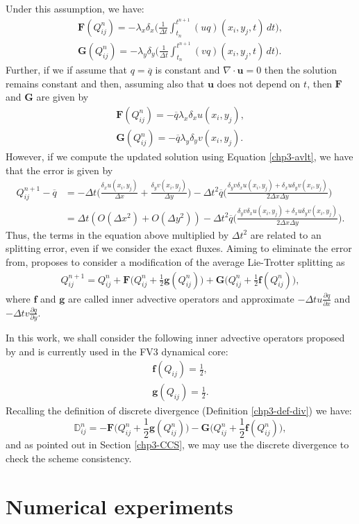Under this assumption, we have:
\begin{align*}
	\mathbf{F}(Q_{ij}^n) = -\lambda_x{\delta_x}\bigg(\frac{1}{\Delta t} \int_{t_n}^{t^{n+1}} (uq)(x_i,y_j,t) \,dt \bigg) ,\\
	\mathbf{G}(Q_{ij}^n) = -\lambda_y{\delta_y}\bigg(\frac{1}{\Delta t} \int_{t_n}^{t^{n+1}} (vq)(x_i,y_j,t) \,dt \bigg).
\end{align*}
Further, if we if assume that $q = \overline{q}$ is constant and $\nabla \cdot \boldsymbol{u} = 0$ then the solution
remains constant and then, assuming also that $\boldsymbol{u}$ does not depend on $t$, then $\mathbf{F}$ and $\mathbf{G}$ are given by
\begin{align*}
	\mathbf{F}(Q_{ij}^n) = -\overline{q} \lambda_x{\delta_x} u(x_i,y_j),\\
	\mathbf{G}(Q_{ij}^n) = -\overline{q} \lambda_y{\delta_y} v(x_i,y_j).
\end{align*}
However, if we compute the updated solution using Equation \eqref{chp3-avlt}, we have that the error is given by
\begin{align*}
	Q^{n+1}_{ij} - \overline{q} &= 
	-\Delta t \bigg(\frac{\delta_x u(x_i,y_j)}{\Delta x} + 	\frac{\delta_y v(x_i,y_j)}{\Delta y} \bigg)
	-\Delta t^2 \overline{q}\bigg( \frac{\delta_y v \delta_x u(x_i,y_j) + \delta_x u\delta_y v(x_i,y_j)}{2\Delta x \Delta y} \bigg) \\
	&= \Delta t (O(\Delta x^2) + O(\Delta y^2))
	   -\Delta t^2 \overline{q}\bigg( \frac{\delta_y v \delta_x u(x_i,y_j) + \delta_x u\delta_y v(x_i,y_j)}{2\Delta x \Delta y} \bigg).
\end{align*}
Thus, the terms in the equation above multiplied by $\Delta t^2$ are related to an splitting error, even if we consider the exact fluxes.
Aiming to eliminate the error from, \citet{lin:1996} proposes to consider a modification of the average Lie-Trotter splitting as
\begin{align}
	\label{chp3-avlt2}
	Q^{n+1}_{ij} = Q_{ij}^n +  
	\mathbf{F}\bigg(Q_{ij}^n + \frac{1}{2}\mathbf{g}(Q_{ij}^n)\bigg) +  
	\mathbf{G}\bigg(Q_{ij}^n + \frac{1}{2}\mathbf{f}(Q_{ij}^n)\bigg),
\end{align}
where $\mathbf{f}$ and $\mathbf{g}$ are called inner advective operators and approximate
$-\Delta t u \frac{\partial q}{\partial x}$ and $-\Delta t v \frac{\partial q}{\partial y}$.

In this work, we shall consider the following  inner advective operators proposed by \citet{putman:2007}
and is currently used in the FV3 dynamical core:
\begin{align}
	\mathbf{f}(Q_{ij}) = \frac{1}{2},\\
	\mathbf{g}(Q_{ij}) = \frac{1}{2}.
\end{align}
Recalling the definition of discrete divergence (Definition \ref{chp3-def-div}) we have:
\begin{equation}
	\mathbb{D}_{ij}^n = 
	-\mathbf{F}\bigg(Q_{ij}^n + \frac{1}{2}\mathbf{g}(Q_{ij}^n)\bigg) 
	-\mathbf{G}\bigg(Q_{ij}^n + \frac{1}{2}\mathbf{f}(Q_{ij}^n)\bigg),
\end{equation}
and as pointed out in Section \ref{chp3-CCS}, we may use the discrete divergence to check the scheme consistency. 
\section{Numerical experiments}
\label{sec-ds-exp}

